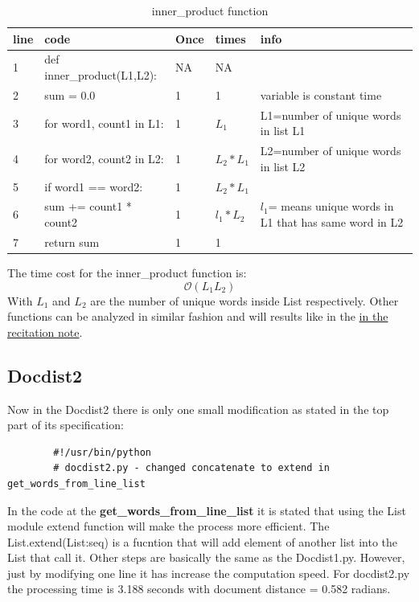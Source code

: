\documentclass{article}
\begin{document}
    \begin{table}[H]
        \begin{center}
            \caption{inner\_product function}
            \begin{tabular}{l|l|l|l|p{5cm}}
                \hline
                line & code & Once & times & info\\
                \hline
                1 & def inner\_product(L1,L2):&NA&NA&\\
                \hline
                2 & sum = 0.0 & 1 & 1 & variable is constant time\\
                \hline
                3 & for word1, count1 in L1: & 1 & $L_1$ & L1=number of unique words in list L1\\
                \hline
                4 & for word2, count2 in L2: & 1 & $L_2*L_1$ & L2=number of unique words in list L2\\
                \hline
                5 & if word1 == word2: & 1 & $L_2*L_1$ & \\
                \hline
                6 & sum += count1 * count2 & 1 & $l_1*L_2$ & $l_1$= means unique words in L1 that has same word in L2 \\
                \hline
                7 & return sum & 1 & 1 & \\
                \hline
            \end{tabular}
        \end{center}
    \end{table}
    The time cost for the inner\_product function is: 
    \[\mathcal{O}(L_1 L_2) \]
    With $L_1$ and $L_2$ are the number of unique words inside List respectively.
    Other functions can be analyzed in similar fashion and will results like in the \href{https://ocw.mit.edu/courses/electrical-engineering-and-computer-science/6-006-introduction-to-algorithms-fall-2011/recitation-videos/MIT6_006F11_rec02.pdf}{in the recitation note}.
    \subsection{Docdist2}
    Now in the Docdist2 there is only one small modification as stated in the top part of its specification:
    \begin{lstlisting}
        #!/usr/bin/python
        # docdist2.py - changed concatenate to extend in get_words_from_line_list
    \end{lstlisting}
    In the code at the \textbf{get\_words\_from\_line\_list} it is stated that using the List module extend function will make the process more efficient. 
    The List.extend(List:seq) is a fucntion that will add element of another list into the List that call it. 
    Other steps are basically the same as the Docdist1.py.
    However, just by modifying one line it has increase the computation speed.
    For docdist2.py the processing time is 3.188 seconds with document distance = 0.582 radians.
\end{document}
